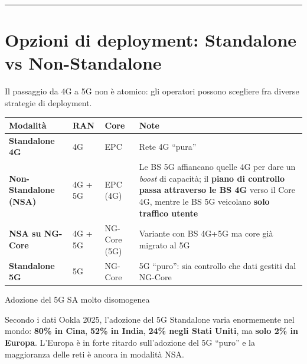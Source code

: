 \documentclass[
  italian,
  openany]{book}
\newcounter{none} %
\begin{document}
\begin{center}\rule{0.5\linewidth}{0.5pt}\end{center}

\section{Opzioni di deployment: Standalone vs
Non-Standalone}\label{opzioni-di-deployment-standalone-vs-non-standalone}

Il passaggio da 4G a 5G non è atomico: gli operatori possono scegliere
fra diverse strategie di deployment.

{\def\LTcaptype{none} %
\begin{longtable}[]{@{}
  >{\raggedright\arraybackslash}p{}
  >{\raggedright\arraybackslash}p{}
  >{\raggedright\arraybackslash}p{}
  >{\raggedright\arraybackslash}p{}@{}}
\toprule\noalign{}
\begin{minipage}[b]{\linewidth}\raggedright
Modalità
\end{minipage} & \begin{minipage}[b]{\linewidth}\raggedright
RAN
\end{minipage} & \begin{minipage}[b]{\linewidth}\raggedright
Core
\end{minipage} & \begin{minipage}[b]{\linewidth}\raggedright
Note
\end{minipage} \\
\midrule\noalign{}
\endhead
\bottomrule\noalign{}
\endlastfoot
\textbf{Standalone 4G} & 4G & EPC & Rete 4G ``pura'' \\
\textbf{Non-Standalone (NSA)} & 4G + 5G & EPC (4G) & Le BS 5G affiancano
quelle 4G per dare un \emph{boost} di capacità; il \textbf{piano di
controllo passa attraverso le BS 4G} verso il Core 4G, mentre le BS 5G
veicolano \textbf{solo traffico utente} \\
\textbf{NSA su NG-Core} & 4G + 5G & NG-Core (5G) & Variante con BS 4G+5G
ma core già migrato al 5G \\
\textbf{Standalone 5G} & 5G & NG-Core & 5G ``puro'': sia controllo che
dati gestiti dal NG-Core \\
\end{longtable}
}

\begin{calloutwarning}{Adozione del 5G SA molto disomogenea}

Secondo i dati Ookla 2025, l'adozione del 5G Standalone varia
enormemente nel mondo: \textbf{80\% in Cina}, \textbf{52\% in India},
\textbf{24\% negli Stati Uniti}, ma \textbf{solo 2\% in Europa}.
L'Europa è in forte ritardo sull'adozione del 5G ``puro'' e la
maggioranza delle reti è ancora in modalità NSA.

\end{calloutwarning}
\end{document}
